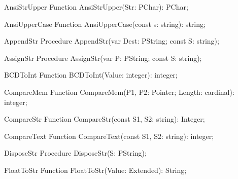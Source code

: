  
\begin{function}{AnsiStrUpper}
\Declaration
Function AnsiStrUpper(Str: PChar): PChar;
\Description
\Errors
\SeeAlso
\end{function}

 
\begin{function}{AnsiUpperCase}
\Declaration
Function AnsiUpperCase(const s: string): string;
\Description
\Errors
\SeeAlso
\end{function}

 
\begin{procedure}{AppendStr}
\Declaration
Procedure AppendStr(var Dest: PString; const S: string);
\Description
\Errors
\SeeAlso
\end{procedure}

 
\begin{procedure}{AssignStr}
\Declaration
Procedure AssignStr(var P: PString; const S: string);
\Description
\Errors
\SeeAlso
\end{procedure}

 
\begin{function}{BCDToInt}
\Declaration
Function BCDToInt(Value: integer): integer;
\Description
\Errors
\SeeAlso
\end{function}

 
\begin{function}{CompareMem}
\Declaration
Function CompareMem(P1, P2: Pointer; Length: cardinal): integer;
\Description
\Errors
\SeeAlso
\end{function}

 
\begin{function}{CompareStr}
\Declaration
Function CompareStr(const S1, S2: string): Integer;
\Description
\Errors
\SeeAlso
\end{function}

 
\begin{function}{CompareText}
\Declaration
Function CompareText(const S1, S2: string): integer;
\Description
\Errors
\SeeAlso
\end{function}

 
\begin{procedure}{DisposeStr}
\Declaration
Procedure DisposeStr(S: PString);
\Description
\Errors
\SeeAlso
\end{procedure}

 
\begin{function}{FloatToStr}
\Declaration
Function FloatToStr(Value: Extended): String;
\Description
\Errors
\SeeAlso
\end{function}

